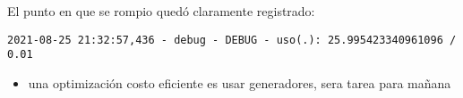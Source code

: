 \documentclass[11pt]{article}
\begin{document}
El punto en que se rompio quedó claramente registrado:


\begin{verbatim}
2021-08-25 21:32:57,436 - debug - DEBUG - uso(.): 25.995423340961096 / 0.01
\end{verbatim}


\begin{itemize}
\item una optimización costo eficiente es usar generadores, sera tarea para mañana
\end{itemize}
\end{document}
